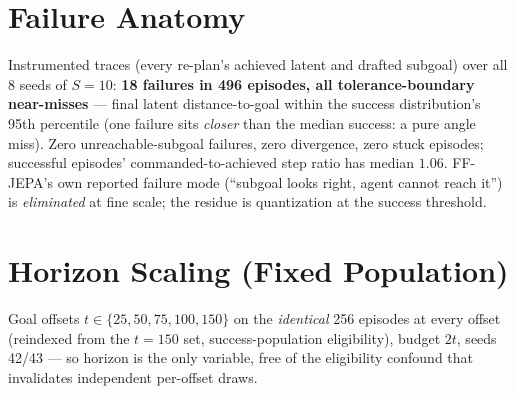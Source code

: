 \documentclass{article}
\begin{document}
\section{Failure Anatomy}
\label{sec:failure}

Instrumented traces (every re-plan's achieved latent and drafted subgoal) over all 8
seeds of $S{=}10$: \textbf{18 failures in 496 episodes, all tolerance-boundary
near-misses} --- final latent distance-to-goal within the success distribution's 95th
percentile (one failure sits \emph{closer} than the median success: a pure angle miss).
Zero unreachable-subgoal failures, zero divergence, zero stuck episodes; successful
episodes' commanded-to-achieved step ratio has median $1.06$. FF-JEPA's own reported
failure mode (``subgoal looks right, agent cannot reach it'') is \emph{eliminated} at fine
scale; the residue is quantization at the success threshold.

\section{Horizon Scaling (Fixed Population)}
\label{sec:horizon}

Goal offsets $t\in\{25,50,75,100,150\}$ on the \emph{identical} 256 episodes at every
offset (reindexed from the $t{=}150$ set, success-population eligibility), budget $2t$,
seeds 42/43 --- so horizon is the only variable, free of the eligibility confound that
invalidates independent per-offset draws.
\end{document}
